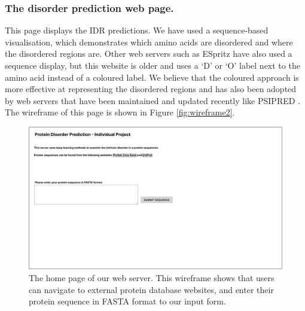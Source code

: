 \documentclass{l4proj}
\begin{document}
\subsubsection{The disorder prediction web page.}

This page displays the IDR predictions. We have used a sequence-based visualisation, which demonstrates which amino acids are disordered and where the disordered regions are. Other web servers such as ESpritz \citep{Walsh:11} have also used a sequence display, but this website is older and uses a ‘D’ or ‘O’ label next to the amino acid instead of a coloured label. We believe that the coloured approach is more effective at representing the disordered regions and has also been adopted by web servers that have been maintained and updated recently like PSIPRED \citep{DISOPRED:server}. The wireframe of this page is shown in Figure \ref{fig:wireframe2}.

\begin{figure}
    \centering
    \includegraphics[width=\linewidth]{dissertation/images/Index - form input.pdf}
    
    \caption{The home page of our web server. This wireframe shows that users can navigate to external protein database websites, and enter their protein sequence in FASTA format to our input form.}
    
    \label{fig:wireframe1} 
\end{figure}
\end{document}
